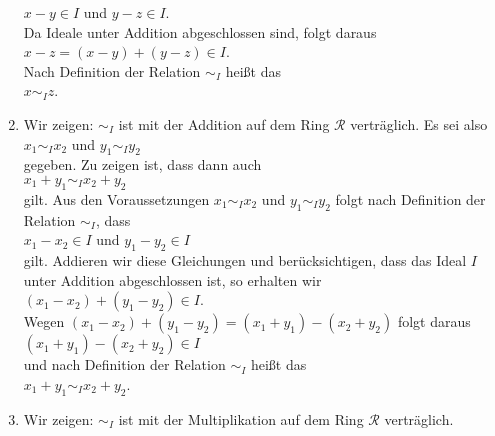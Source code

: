 \begin{enumerate}
      \hspace*{1.3cm}
      $x - y \in I$ \quad und \quad $y - z \in I$.
      \\[0.2cm]
      Da Ideale unter Addition abgeschlossen sind, folgt daraus
      \\[0.2cm]
      \hspace*{1.3cm}
      $x - z = (x - y) + (y - z) \in I$.
      \\[0.2cm]
      Nach Definition der Relation $\sim_I$ heißt das 
      \\[0.2cm]
      \hspace*{1.3cm}
      $x \sim_I z$.  
      \checkmark
\item Wir zeigen: $\sim_I$ ist mit der Addition auf dem Ring $\mathcal{R}$ verträglich.  Es sei
      also
      \\[0.2cm]
      \hspace*{1.3cm}
      $x_1 \sim_I x_2$ \quad und \quad $y_1 \sim_I y_2$ 
      \\[0.2cm]
      gegeben.  Zu zeigen ist, dass dann auch
      \\[0.2cm]
      \hspace*{1.3cm}
      $x_1 + y_1 \sim_I x_2 + y_2$
      \\[0.2cm]
      gilt.  Aus den Voraussetzungen $x_1 \sim_I x_2$  und $y_1 \sim_I y_2$ folgt nach Definition
      der Relation $\sim_I$, dass
      \\[0.2cm]
      \hspace*{1.3cm}
      $x_1 - x_2 \in I$ \quad und \quad $y_1 - y_2 \in I$ 
      \\[0.2cm]
      gilt.  Addieren wir diese Gleichungen und berücksichtigen, dass das Ideal $I$ unter Addition
      abgeschlossen ist, so erhalten wir
      \\[0.2cm]
      \hspace*{1.3cm}
      $(x_1 - x_2) + (y_1 - y_2) \in I$.
      \\[0.2cm]
      Wegen $(x_1 - x_2) + (y_1 - y_2) = (x_1 + y_1) - (x_2 + y_2)$ folgt daraus
      \\[0.2cm]
      \hspace*{1.3cm}
      $(x_1 + y_1) - (x_2 + y_2) \in I$
      \\[0.2cm]
      und nach Definition der Relation $\sim_I$ heißt das
      \\[0.2cm]
      \hspace*{1.3cm}
      $x_1 + y_1 \sim_I x_2 + y_2$. \checkmark
\item Wir zeigen: $\sim_I$ ist mit der Multiplikation auf dem Ring $\mathcal{R}$ verträglich.

\end{enumerate}
